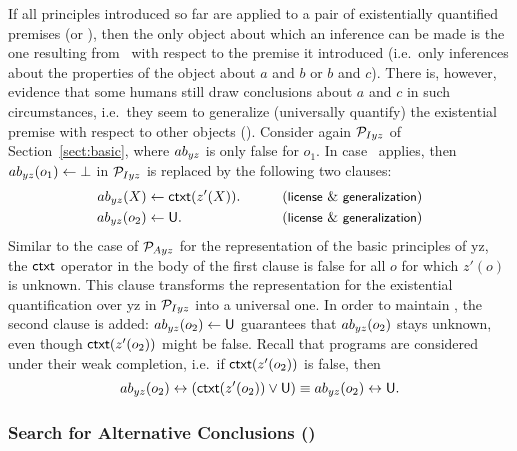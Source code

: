 \documentclass[12pt]{article}
\begin{document}
If all principles introduced so far are applied to a pair of existentially quantified premises
(\MI or \MO), then the only object about which an inference can be made is the one
resulting from \ with respect to the premise it introduced (i.e.\ only inferences about the properties 
of the object about $a$ and $b$ or
$b$ and $c$). 
There is, however, evidence that some humans still draw conclusions about $a$ and $c$ in such
circumstances, i.e.\ they seem to generalize (universally quantify) the existential 
premise with respect to other objects (\negFailure).
Consider again ${\cal P}_{I yz}$ of Section~\ref{sect:basic}, where $ab_{yz}$ is only false for 
$o_1$. In case \negFailure\ applies, then $ab_{yz}(o_1) \leftarrow \bot$
in ${\cal P}_{I yz}$ is replaced by the following two clauses:
\begin{align}
\Ab_{yz}(X) & \leftarrow \cxt(z'(X)). & \tag{\licenses\ \&\ \negFailure} \\
\Ab_{yz}(o_2) & \leftarrow \udf. & \tag{\licenses\ \&\ \negFailure} 
\end{align}
Similar to the case of ${\cal P}_{Ayz}$ for the representation of the basic principles of \MA yz,
the $\mathsf{ctxt}$ operator in the body of the first clause is false for all $o$
for which $z'(o)$ is unknown. This clause transforms the representation for the existential quantification over \MI yz in ${\cal P}_{Iyz}$
into a universal one. In order to maintain \unknownGen, the second clause is added:
$ab_{yz}(o_2) \leftarrow \mathsf{U}$ guarantees that $ab_{yz}(o_2)$ stays unknown, even though $\mathsf{ctxt}(z'(o_2))$ might be false.
Recall that programs are considered under their weak completion, i.e.\ if $\mathsf{ctxt}(z'(o_2))$ is false, then
\[ab_{yz}(o_2) \leftrightarrow (\mathsf{ctxt}(z'(o_2)) \vee \mathsf{U})
 \equiv ab_{yz}(o_2) \leftrightarrow \mathsf{U}.\]




\subsubsection{Search for Alternative Conclusions (\abduction)}
\end{document}
